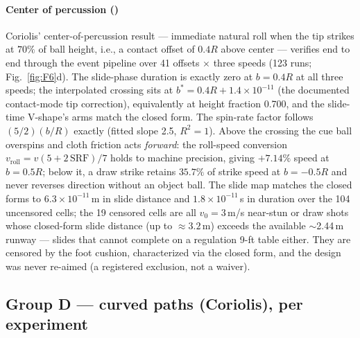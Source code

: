 \paragraph{Center of percussion ()}
Coriolis' center-of-percussion result --- immediate natural roll when the
tip strikes at $70\%$ of ball height, i.e., a contact offset of $0.4R$
above center \citep{coriolis1835,alciatore2008coriolis} --- verifies end
to end through the event pipeline over 41 offsets $\times$ three speeds
(123 runs; Fig.~\ref{fig:F6}d). The slide-phase duration is exactly zero
at $b = 0.4R$ at all three speeds; the interpolated crossing sits at
$b^{*} = 0.4R + 1.4 \times 10^{-11}$ (the documented contact-mode tip
correction), equivalently at height fraction 0.700, and the slide-time
V-shape's arms match the closed form. The spin-rate factor follows
$(5/2)(b/R)$ exactly (fitted slope 2.5, $R^2 = 1$). Above the crossing
the cue ball overspins and cloth friction acts \emph{forward}: the
roll-speed conversion $v_{\mathrm{roll}} = v(5 + 2\,\mathrm{SRF})/7$
holds to machine precision, giving $+7.14\%$ speed at $b = 0.5R$; below
it, a draw strike retains $35.7\%$ of strike speed at $b = -0.5R$ and
never reverses direction without an object ball. The slide map matches
the closed forms to $6.3 \times 10^{-11}$\,m in slide distance and
$1.8 \times 10^{-11}$\,s in duration over the 104 uncensored cells; the
19 censored cells are all $v_0 = 3$\,m/s near-stun or draw shots whose
closed-form slide distance (up to ${\approx}3.2$\,m) exceeds the available
$\sim$2.44\,m runway --- slides that cannot complete on a regulation
9-ft table either. They are censored by the foot cushion, characterized
via the closed form, and the design was never re-aimed (a registered
exclusion, not a waiver).

\subsection{Group D --- curved paths (Coriolis), per experiment}
\label{sec:supp-results-d}

